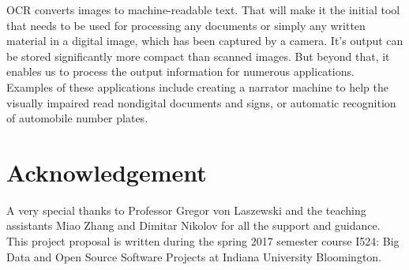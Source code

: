 \documentclass[9pt,twocolumn,twoside]{../../styles/osajnl}
\begin{document}
OCR converts images to machine-readable text. That will make it the
initial tool that needs to be used for processing any documents or
simply any written material in a digital image, which has been
captured by a camera\cite{www-ocr-wiki}. It’s output can be stored significantly more
compact than scanned images. But beyond that, it enables us to process
the output information for numerous applications. Examples of these
applications include creating a narrator machine to help the visually
impaired read nondigital documents and signs, or automatic recognition
of automobile number plates.

\section{Acknowledgement}
A very special thanks to Professor Gregor von Laszewski and the
teaching assistants Miao Zhang and Dimitar Nikolov for all the support
and guidance. This project proposal is written during the spring 2017
semester course {I524: Big Data and Open Source Software Projects} at
Indiana University Bloomington.


\end{document}

